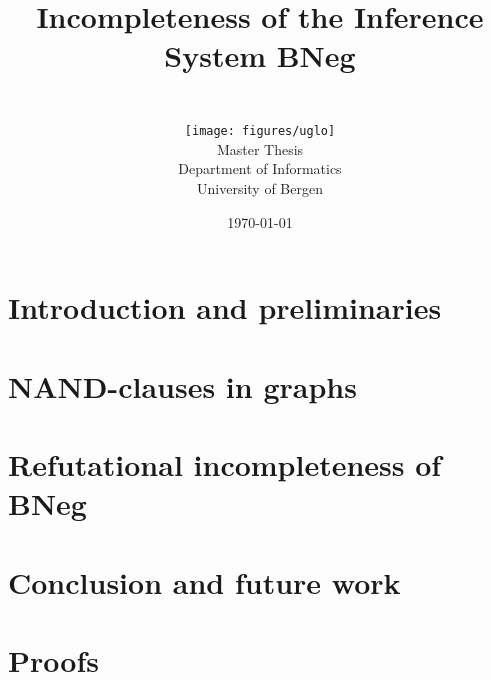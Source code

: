 \documentclass[11pt, a4paper]{report}   	%
\title{
{\fontsize{28}{36}Incompleteness of the Inference System BNeg}
	\author{
	\name\vspace{3cm}\\
		\texttt{[image: figures/uglo]}\vspace{2em}\\
		Master Thesis\vspace{2em}\\
		Department of Informatics\\
		University of Bergen
	}
	\date{\today}
}
\theoremstyle{plain}
\theoremstyle{definition}
\begin{document}
	\maketitle
  \begin{abstract}
    
  \end{abstract}
	\tableofcontents
  \chapter{Introduction and preliminaries}
  \label{chap:Introduction}
  
  
  
  
	
	
	
	
	\chapter{NAND-clauses in graphs}
	\label{chap:NAND-clauses in graphs}
	
	
	
	
  
	
  
	\chapter{Refutational incompleteness of BNeg}
	\label{chap:Refutational incompleteness of BNeg}
	
	
	
  
  \pagebreak %
  
  
  \chapter{Conclusion and future work}
  \label{chap:Conclusion and future work}
  
  \appendix
  \chapter{Proofs}
  \label{chap:Proofs}
  
	\pagebreak
	
	\pagebreak
	
  \pagebreak
	\printbibliography
\end{document}
